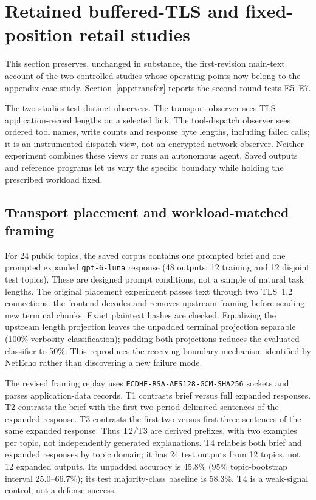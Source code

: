 \section{Retained buffered-TLS and fixed-position retail studies}\label{app:retained-controlled}
This section preserves, unchanged in substance, the first-revision main-text account of the two controlled studies whose operating points now belong to the appendix case study. Section~\ref{app:transfer} reports the second-round tests E5--E7.

The two studies test distinct observers. The transport observer sees TLS application-record lengths on a selected link. The tool-dispatch observer sees ordered tool names, write counts and response byte lengths, including failed calls; it is an instrumented dispatch view, not an encrypted-network observer. Neither experiment combines these views or runs an autonomous agent. Saved outputs and reference programs let us vary the specific boundary while holding the prescribed workload fixed.

\subsection{Transport placement and workload-matched framing}
For 24 public topics, the saved corpus contains one prompted brief and one prompted expanded \texttt{gpt-6-luna} response (48 outputs; 12 training and 12 disjoint test topics). These are designed prompt conditions, not a sample of natural task lengths. The original placement experiment passes text through two TLS~1.2 connections: the frontend decodes and removes upstream framing before sending new terminal chunks. Exact plaintext hashes are checked. Equalizing the upstream length projection leaves the unpadded terminal projection separable (100\% verbosity classification); padding both projections reduces the evaluated classifier to 50\%. This reproduces the receiving-boundary mechanism identified by NetEcho rather than discovering a new failure mode.

The revised framing replay uses \texttt{ECDHE-RSA-AES128-GCM-SHA256} sockets and parses application-data records. T1 contrasts brief versus full expanded responses. T2 contrasts the brief with the first two period-delimited sentences of the expanded response. T3 contrasts the first two versus first three sentences of the same expanded response. Thus T2/T3 are derived prefixes, with two examples per topic, not independently generated explanations. T4 relabels both brief and expanded responses by topic domain; it has 24 test outputs from 12 topics, not 12 expanded outputs. Its unpadded accuracy is 45.8\% (95\% topic-bootstrap interval 25.0--66.7\%); its test majority-class baseline is 58.3\%. T4 is a weak-signal control, not a defense success.

